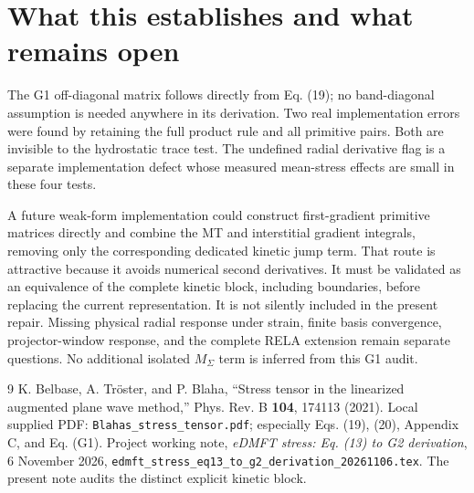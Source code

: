 \documentclass[11pt]{article}
\begin{document}
\section{What this establishes and what remains open}
The G1 off-diagonal matrix follows directly from Eq. (19); no band-diagonal assumption is needed anywhere in its derivation. Two real implementation errors were found by retaining the full product rule and all primitive pairs. Both are invisible to the hydrostatic trace test. The undefined radial derivative flag is a separate implementation defect whose measured mean-stress effects are small in these four tests.

A future weak-form implementation could construct first-gradient primitive matrices directly and combine the MT and interstitial gradient integrals, removing only the corresponding dedicated kinetic jump term. That route is attractive because it avoids numerical second derivatives. It must be validated as an equivalence of the complete kinetic block, including boundaries, before replacing the current representation. It is not silently included in the present repair. Missing physical radial response under strain, finite basis convergence, projector-window response, and the complete RELA extension remain separate questions. No additional isolated $M_\Sigma$ term is inferred from this G1 audit.

\begin{thebibliography}{9}
 K. Belbase, A. Tr\"oster, and P. Blaha, ``Stress tensor in the linearized augmented plane wave method,'' Phys. Rev. B \textbf{104}, 174113 (2021). Local supplied PDF: \texttt{Blahas\_stress\_tensor.pdf}; especially Eqs. (19), (20), Appendix C, and Eq. (G1).
 Project working note, \emph{eDMFT stress: Eq. (13) to G2 derivation}, 6 November 2026, \texttt{edmft\_stress\_eq13\_to\_g2\_derivation\_20261106.tex}. The present note audits the distinct explicit kinetic block.
\end{thebibliography}
\end{document}
